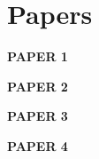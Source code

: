 \backmatter

\chapter{Papers}
\newpage

\begin{center}
\textbf{\fontsize{70}{1} \selectfont PAPER 1}
\end{center}




\begin{center}
\textbf{\fontsize{70}{1} \selectfont PAPER 2}
\end{center}



\begin{center}
\textbf{\fontsize{70}{1} \selectfont PAPER 3}
\end{center}



\begin{center}
\textbf{\fontsize{70}{1} \selectfont PAPER 4}
\end{center}




%
